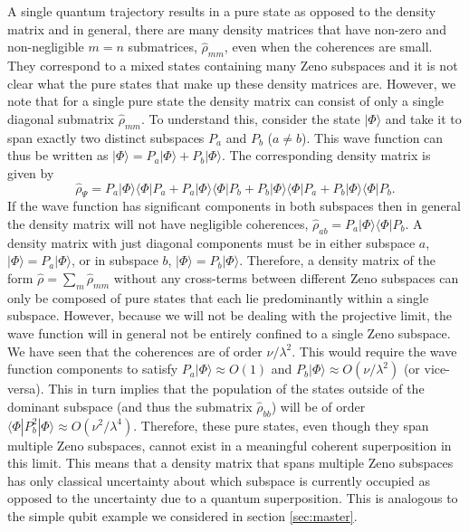 A single quantum trajectory results in a pure state as opposed to the
density matrix and in general, there are many density matrices that
have non-zero and non-negligible $m = n$ submatrices,
$\hat{\rho}_{mm}$, even when the coherences are small. They correspond
to a mixed states containing many Zeno subspaces and it is not clear
what the pure states that make up these density matrices are. However,
we note that for a single pure state the density matrix can consist of
only a single diagonal submatrix $\hat{\rho}_{mm}$. To understand
this, consider the state $| \Phi \rangle$ and take it to span exactly
two distinct subspaces $P_a$ and $P_b$ ($a \ne b$). This wave function
can thus be written as
$| \Phi \rangle = P_a | \Phi \rangle + P_b | \Phi \rangle$. The
corresponding density matrix is given by
\begin{equation}
  \hat{\rho}_\Psi = P_a | \Phi \rangle \langle \Phi | P_a + P_a | \Phi
  \rangle \langle \Phi | P_b + P_b | \Phi \rangle \langle \Phi | P_a +
  P_b | \Phi \rangle \langle \Phi | P_b.
\end{equation}
If the wave function has significant components in both subspaces then
in general the density matrix will not have negligible coherences,
$\hat{\rho}_{ab} = P_a | \Phi \rangle \langle \Phi | P_b$. A density
matrix with just diagonal components must be in either subspace $a$,
$| \Phi \rangle = P_a | \Phi \rangle$, or in subspace $b$,
$| \Phi \rangle = P_b | \Phi \rangle$. Therefore, a density matrix of
the form $\hat{\rho} = \sum_m \hat{\rho}_{mm}$ without any cross-terms
between different Zeno subspaces can only be composed of pure states
that each lie predominantly within a single subspace. However, because
we will not be dealing with the projective limit, the wave function
will in general not be entirely confined to a single Zeno subspace. We
have seen that the coherences are of order $\nu/\lambda^2$. This would
require the wave function components to satisfy
$P_a | \Phi \rangle \approx O(1)$ and
$P_b | \Phi \rangle \approx O(\nu/\lambda^2)$ (or vice-versa). This in
turn implies that the population of the states outside of the dominant
subspace (and thus the submatrix $\hat{\rho}_{bb}$) will be of order
$\langle \Phi | P_b^2 | \Phi \rangle \approx
O(\nu^2/\lambda^4)$. Therefore, these pure states, even though they
span multiple Zeno subspaces, cannot exist in a meaningful coherent
superposition in this limit. This means that a density matrix that
spans multiple Zeno subspaces has only classical uncertainty about
which subspace is currently occupied as opposed to the uncertainty due
to a quantum superposition. This is analogous to the simple qubit
example we considered in section \ref{sec:master}.
 
